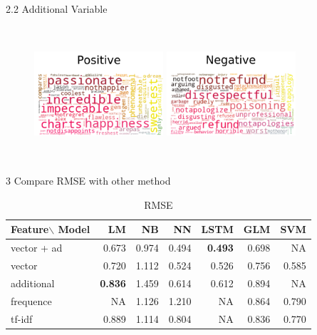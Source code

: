 \documentclass[10pt]{beamer}
\begin{document}
\begin{frame}{2.2 Additional Variable}
\begin{figure}[htbp]
\centering
\begin{minipage}[t]{0.5\textwidth}
\centering
\includegraphics[width=4.8cm,height=5cm]{../image/dist5.png}

\end{minipage}
\begin{minipage}[t]{0.48\textwidth}
\centering
\includegraphics[width=4.8cm,height=5cm]{../image/dist1.png}

\end{minipage}
\end{figure}
\end{frame}

\begin{frame}{3 Compare RMSE with other method}

\begin{table}[]
\centering
\caption*{\huge{RMSE}}

\begin{tabular}{lrrrrrr}
Feature$\backslash$ Model &LM    & NB &NN  &LSTM  &GLM  & SVM \\
\hline
vector + ad   & 0.673     & 0.974  & 0.494   & \large\textbf{0.493}  & 0.698    & NA \\
vector        & 0.720     & 1.112  & 0.524   & 0.526  & 0.756    & 0.585  \\
additional            & \textbf{0.836}    & 1.459  & 0.614   & 0.612  & 0.894    & NA  \\
frequence     & NA & 1.126  & 1.210   & NA  & 0.864    & 0.790  \\
tf-idf        & 0.889 & 1.114 & 0.804   & NA  & 0.836    & 0.770  \\
\hline
\end{tabular}
\label{table:nonlin} 
\end{table}

\end{frame}
\end{document}
